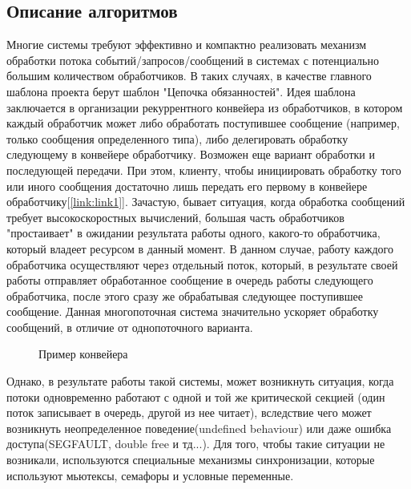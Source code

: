 \documentclass[a4paper,12pt]{article}
\begin{document}
\subsection{Описание алгоритмов}
Многие системы требуют эффективно и компактно реализовать механизм обработки потока событий/запросов/сообщений в системах с потенциально большим количеством обработчиков. В таких случаях, в качестве главного шаблона проекта берут шаблон "Цепочка обязанностей".
Идея шаблона заключается в организации рекуррентного конвейера из обработчиков, в котором каждый обработчик может либо обработать поступившее сообщение (например, только сообщения определенного типа), либо делегировать обработку следующему в конвейере обработчику. Возможен еще вариант обработки и последующей передачи. При этом, клиенту, чтобы инициировать обработку того или иного сообщения достаточно лишь передать его первому в конвейере обработчику[\ref{link:link1}].
Зачастую, бывает ситуация, когда обработка сообщений требует высокоскоростных вычислений, большая часть обработчиков "простаивает" в ожидании результата работы одного, какого-то обработчика, который владеет ресурсом в данный момент.
В данном случае, работу каждого обработчика осуществляют через отдельный поток, который, в результате своей работы отправляет обработанное сообщение в очередь работы следующего обработчика, после этого сразу же обрабатывая следующее поступившее сообщение. Данная многопоточная система значительно ускоряет обработку сообщений, в отличие от однопоточного варианта.
\begin{figure}[h]
\caption{Пример конвейера}
\label{images:example1}
\end{figure}
Однако, в результате работы такой системы, может возникнуть ситуация, когда потоки одновременно работают с одной и той же критической секцией (один поток записывает в очередь, другой из нее читает), вследствие чего может возникнуть неопределенное поведение(undefined behaviour) или даже ошибка доступа(SEGFAULT, double free и тд...). Для того, чтобы такие ситуации не возникали, используются специальные механизмы синхронизации, которые используют мьютексы, семафоры и условные переменные.
\end{document}

